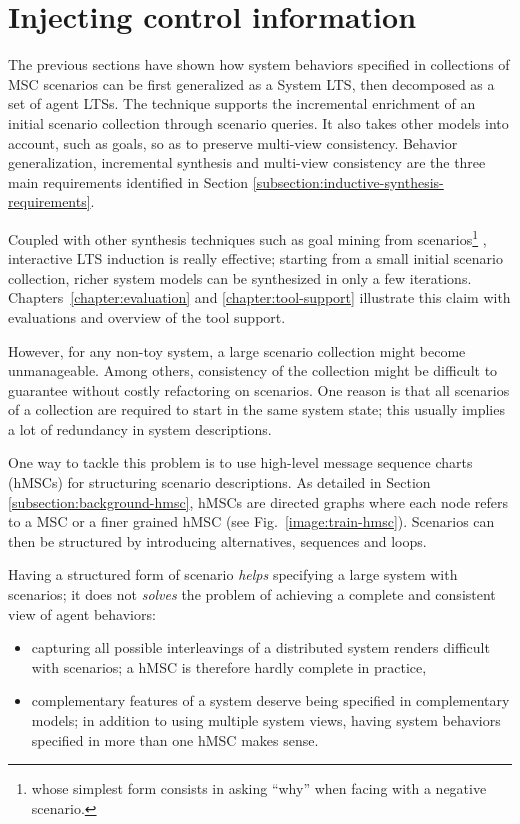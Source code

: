 \section{Injecting control information\label{section:inductive-from-hMSC}}

The previous sections have shown how system behaviors specified in collections of MSC scenarios can be first generalized as a System LTS, then decomposed as a set of agent LTSs. The technique supports the incremental enrichment of an initial scenario collection through scenario queries. It also takes other models into account, such as goals, so as to preserve multi-view consistency. Behavior generalization, incremental synthesis and multi-view consistency are the three main requirements identified in Section \ref{subsection:inductive-synthesis-requirements}. 

Coupled with other synthesis techniques such as goal mining from scenarios\footnote{whose simplest form consists in asking ``why'' when facing with a negative scenario.} \cite{Damas:2006}, interactive LTS induction is really effective; starting from a small initial scenario collection, richer system models can be synthesized in only a few iterations. Chapters~\ref{chapter:evaluation} and \ref{chapter:tool-support} illustrate this claim with evaluations and overview of the tool support.

However, for any non-toy system, a large scenario collection might become unmanageable. Among others, consistency of the collection might be difficult to guarantee without costly refactoring on scenarios. One reason is that all scenarios of a collection are required to start in the same system state; this usually implies a lot of redundancy in system descriptions.

One way to tackle this problem is to use high-level message sequence charts (hMSCs) for structuring scenario descriptions. As detailed in Section \ref{subsection:background-hmsc}, hMSCs are directed graphs where each node refers to a MSC or a finer grained hMSC (see Fig.~\ref{image:train-hmsc}). Scenarios can then be structured by introducing alternatives, sequences and loops.

Having a structured form of scenario \emph{helps} specifying a large system with scenarios; it does not \emph{solves} the problem of achieving a complete and consistent view of agent behaviors:
\begin{itemize}
\item capturing all possible interleavings of a distributed system renders difficult with scenarios; a hMSC is therefore hardly complete in practice,
\item complementary features of a system deserve being specified in complementary models; in addition to using multiple system views, having system behaviors specified in more than one hMSC makes sense.
\end{itemize}

